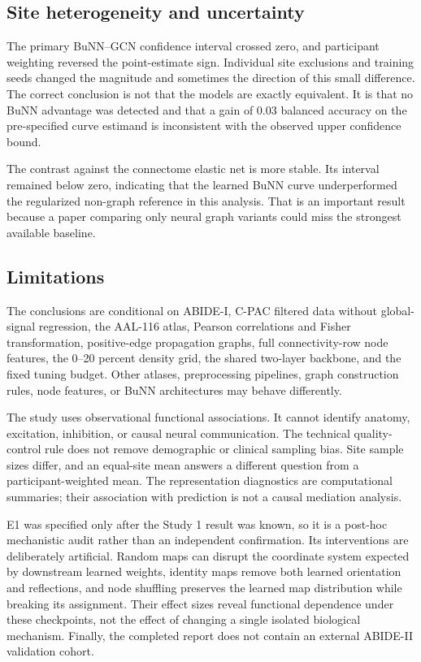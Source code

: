 \documentclass[11pt,a4paper]{article}
\begin{document}
\subsection{Site heterogeneity and uncertainty}

The primary BuNN--GCN confidence interval crossed zero, and participant
weighting reversed the point-estimate sign. Individual site exclusions and
training seeds changed the magnitude and sometimes the direction of this
small difference. The correct conclusion is not that the models are exactly
equivalent. It is that no BuNN advantage was detected and that a gain of 0.03
balanced accuracy on the pre-specified curve estimand is inconsistent with
the observed upper confidence bound.

The contrast against the connectome elastic net is more stable. Its interval
remained below zero, indicating that the learned BuNN curve underperformed the
regularized non-graph reference in this analysis. That is an important result
because a paper comparing only neural graph variants could miss the strongest
available baseline.

\subsection{Limitations}

The conclusions are conditional on ABIDE-I, C-PAC filtered data without
global-signal regression, the AAL-116 atlas, Pearson correlations and Fisher
transformation, positive-edge propagation graphs, full connectivity-row node
features, the 0--20 percent density grid, the shared two-layer backbone, and
the fixed tuning budget. Other atlases, preprocessing pipelines, graph
construction rules, node features, or BuNN architectures may behave
differently.

The study uses observational functional associations. It cannot identify
anatomy, excitation, inhibition, or causal neural communication. The technical
quality-control rule does not remove demographic or clinical sampling bias.
Site sample sizes differ, and an equal-site mean answers a different question
from a participant-weighted mean. The representation diagnostics are
computational summaries; their association with prediction is not a causal
mediation analysis.

E1 was specified only after the Study 1 result was known, so it is a post-hoc
mechanistic audit rather than an independent confirmation. Its interventions
are deliberately artificial. Random maps can disrupt the coordinate system
expected by downstream learned weights, identity maps remove both learned
orientation and reflections, and node shuffling preserves the learned map
distribution while breaking its assignment. Their effect sizes reveal
functional dependence under these checkpoints, not the effect of changing a
single isolated biological mechanism. Finally, the completed report does not
contain an external ABIDE-II validation cohort.
\end{document}
